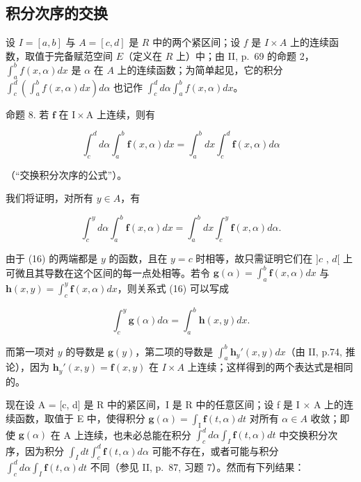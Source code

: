 \subsection{积分次序的交换}

设 \(I = [a, b]\) 与 \(A = [c, d]\) 是 \(R\) 中的两个紧区间；设 \(f\) 是 \(I \times A\) 上的连续函数，取值于完备赋范空间 \(E\)（定义在 \(R\) 上）中；由 II, p.~69 的命题 2，\(\int_{a}^{b} f(x, \alpha) dx\) 是 \(\alpha\) 在 \(A\) 上的连续函数；为简单起见，它的积分 \(\int_{c}^{d} \left( \int_{a}^{b} f(x, \alpha) dx \right) d\alpha\) 也记作 \(\int_{c}^{d} d\alpha \int_{a}^{b} f(x, \alpha) dx\)。

命题 8. 若 \(\mathbf{f}\) 在 \(\mathrm{I} \times \mathrm{A}\) 上连续，则有

\[
\int_ {c} ^ {d} d \alpha \int_ {a} ^ {b} \mathbf {f} (x, \alpha) d x = \int_ {a} ^ {b} d x \int_ {c} ^ {d} \mathbf {f} (x, \alpha) d \alpha\tag{15}
\]

（“交换积分次序的公式”）。

我们将证明，对所有 \(y \in A\)，有

\[
\int_ {c} ^ {y} d \alpha \int_ {a} ^ {b} \mathbf {f} (x, \alpha) d x = \int_ {a} ^ {b} d x \int_ {c} ^ {y} \mathbf {f} (x, \alpha) d \alpha .\tag{16}
\]

由于 (16) 的两端都是 \(y\) 的函数，且在 \(y = c\) 时相等，故只需证明它们在 \(]c\) , \(d[\) 上可微且其导数在这个区间的每一点处相等。若令 \(\mathbf{g}(\alpha) = \int_{a}^{b} \mathbf{f}(x, \alpha) dx\) 与 \(\mathbf{h}(x, y) = \int_{c}^{y} \mathbf{f}(x, \alpha) dx\)，则关系式 (16) 可以写成

\[
\int_ {c} ^ {y} \mathbf {g} (\alpha) d \alpha = \int_ {a} ^ {b} \mathbf {h} (x, y) d x.
\]

而第一项对 \(y\) 的导数是 \(\mathbf{g}(y)\)，第二项的导数是 \(\int_{a}^{b} \mathbf{h}_{y}'(x, y) dx\)（由 II, p.74, 推论），因为 \(\mathbf{h}_{y}'(x, y) = \mathbf{f}(x, y)\) 在 \(I \times A\) 上连续；这样得到的两个表达式是相同的。

现在设 A = {[}c, d{]} 是 R 中的紧区间，I 是 R 中的任意区间；设 f 是 I × A 上的连续函数，取值于 E 中，使得积分 \(\mathbf{g}(\alpha) = \int_{\mathrm{I}} \mathbf{f}(t, \alpha) dt\) 对所有 \(\alpha \in A\) 收敛；即使 \(\mathbf{g}(\alpha)\) 在 A 上连续，也未必总能在积分 \(\int_{c}^{d} d\alpha \int_{I} \mathbf{f}(t, \alpha) dt\) 中交换积分次序，因为积分 \(\int_{I} dt \int_{c}^{d} \mathbf{f}(t, \alpha) d\alpha\) 可能不存在，或者可能与积分 \(\int_{c}^{d} d\alpha \int_{I} \mathbf{f}(t, \alpha) dt\) 不同（参见 II, p.~87, 习题 7）。然而有下列结果：

